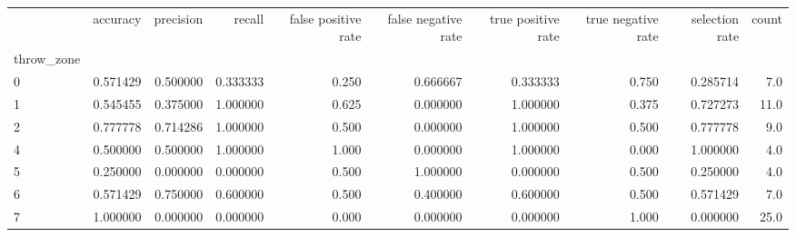 \begin{tabular}{lrrrrrrrrr}
\toprule
{} &  accuracy &  precision &    recall &  false positive rate &  false negative rate &  true positive rate &  true negative rate &  selection rate &  count \\
throw\_zone &           &            &           &                      &                      &                     &                     &                 &        \\
\midrule
0          &  0.571429 &   0.500000 &  0.333333 &                0.250 &             0.666667 &            0.333333 &               0.750 &        0.285714 &    7.0 \\
1          &  0.545455 &   0.375000 &  1.000000 &                0.625 &             0.000000 &            1.000000 &               0.375 &        0.727273 &   11.0 \\
2          &  0.777778 &   0.714286 &  1.000000 &                0.500 &             0.000000 &            1.000000 &               0.500 &        0.777778 &    9.0 \\
4          &  0.500000 &   0.500000 &  1.000000 &                1.000 &             0.000000 &            1.000000 &               0.000 &        1.000000 &    4.0 \\
5          &  0.250000 &   0.000000 &  0.000000 &                0.500 &             1.000000 &            0.000000 &               0.500 &        0.250000 &    4.0 \\
6          &  0.571429 &   0.750000 &  0.600000 &                0.500 &             0.400000 &            0.600000 &               0.500 &        0.571429 &    7.0 \\
7          &  1.000000 &   0.000000 &  0.000000 &                0.000 &             0.000000 &            0.000000 &               1.000 &        0.000000 &   25.0 \\
\bottomrule
\end{tabular}
